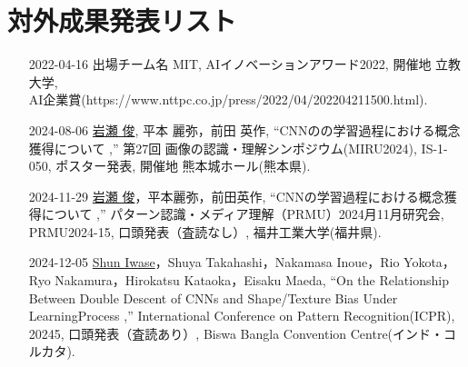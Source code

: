 \chapter{対外成果発表リスト}
\begin{enumerate}
    \item[2022-04-16] 出場チーム名 MIT, AIイノベーションアワード2022, 開催地 立教大学, \\AI企業賞(https://www.nttpc.co.jp/press/2022/04/202204211500.html).
    \item[2024-08-06] \underline{岩瀬 俊}, 平本 麗弥，前田 英作, ``CNNのの学習過程における概念獲得について
,''  第27回 画像の認識・理解シンポジウム(MIRU2024), IS-1-050, ポスター発表, 開催地 熊本城ホール(熊本県).
    \item[2024-11-29]  \underline{岩瀬 俊}，平本麗弥，前田英作, ``CNNの学習過程における概念獲得について
,''  パターン認識・メディア理解（PRMU）2024月11月研究会, PRMU2024-15, 口頭発表（査読なし）, 福井工業大学(福井県).
    \item[2024-12-05] \underline{Shun Iwase}，Shuya Takahashi，Nakamasa Inoue，Rio Yokota，Ryo Nakamura，Hirokatsu Kataoka，Eisaku Maeda, ``On the Relationship Between Double Descent of CNNs and Shape/Texture Bias Under LearningProcess
,''  International Conference on Pattern Recognition(ICPR), 20245, 口頭発表（査読あり）, Biswa Bangla Convention Centre(インド・コルカタ).

\end{enumerate}
